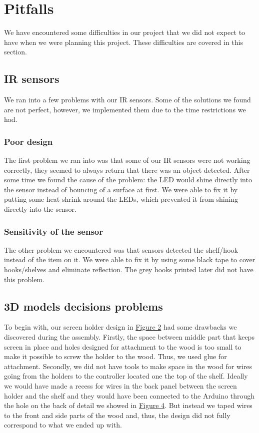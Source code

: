 \documentclass{article}
\begin{document}
\section{Pitfalls}
We have encountered some difficulties in our project that we did not expect to have when we were planning this project. These difficulties are covered in this section.

\subsection{IR sensors} 
\label{sec:ir}
We ran into a few problems with our IR sensors. Some of the solutions we found are not perfect, however, we implemented them due to the time restrictions we had.

\subsubsection{Poor design}
The first problem we ran into was that some of our IR sensors were not working correctly, they seemed to always return that there was an object detected. After some time we found the cause of the problem: the LED would shine directly into the sensor instead of bouncing of a surface at first. We were able to fix it by putting some heat shrink around the LEDs, which prevented it from shining directly into the sensor.

\subsubsection{Sensitivity of the sensor}
The other problem we encountered was that sensors detected the shelf/hook instead of the item on it. We were able to fix it by using some black tape to cover hooks/shelves and eliminate reflection. The grey hooks printed later did not have this problem.

\subsection{3D models decisions problems} 
\label{sec:3dproblems}
To begin with, our screen holder design in \hyperref[fig:screen]{Figure 2} had some drawbacks we discovered during the assembly. Firstly, the space between middle part that keeps screen in place and holes designed for attachment to the wood is too small to make it possible to screw the holder to the wood. Thus, we used glue for attachment. Secondly, we did not have tools to make space in the wood for wires going from the holders to the controller located one the top of the shelf. Ideally we would have made a recess for wires in the back panel between the screen holder and the shelf and they would have been connected to the Arduino through the hole on the back of detail we showed in \hyperref[fig:shelf-back]{Figure 4}. But instead we taped wires to the front and side parts of the wood and, thus, the design did not fully correspond to what we ended up with.
\end{document}
